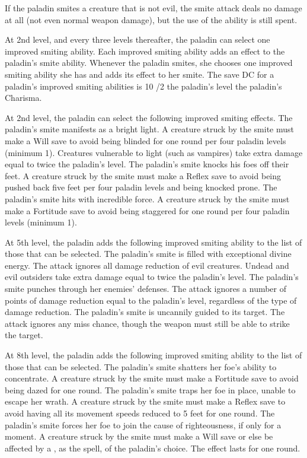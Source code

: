 If the paladin smites a creature that is not evil, the smite attack deals no damage at all (not even normal weapon damage), but the use of the ability is still spent.

 At 2nd level, and every three levels thereafter, the paladin can select one improved smiting ability. Each improved smiting ability adds an effect to the paladin's smite ability. Whenever the paladin smites, she chooses one improved smiting ability she has and adds its effect to her smite. The save DC for a paladin's improved smiting abilities is 10 /2 the paladin's level \add the paladin's Charisma.
\par At 2nd level, the paladin can select the following improved smiting effects.
 The paladin's smite manifests as a bright light. A creature struck by the smite must make a Will save to avoid being blinded for one round per four paladin levels (minimum 1). Creatures vulnerable to light (such as vampires) take extra damage equal to twice the paladin's level.
 The paladin's smite knocks his foes off their feet. A creature struck by the smite must make a Reflex save to avoid being pushed back five feet per four paladin levels and being knocked prone.
 The paladin's smite hits with incredible force. A creature struck by the smite must make a Fortitude save to avoid being staggered for one round per four paladin levels (minimum 1).

At 5th level, the paladin adds the following improved smiting ability to the list of those that can be selected.
 The paladin's smite is filled with exceptional divine energy. The attack ignores all damage reduction of evil creatures. Undead and evil outsiders take extra damage equal to twice the paladin's level.
 The paladin's smite punches through her enemies' defenses. The attack ignores a number of points of damage reduction equal to the paladin's level, regardless of the type of damage reduction.
 The paladin's smite is uncannily guided to its target. The attack ignores any miss chance, though the weapon must still be able to strike the target.

At 8th level, the paladin adds the following improved smiting ability to the list of those that can be selected.
 The paladin's smite shatters her foe's ability to concentrate. A creature struck by the smite must make a Fortitude save to avoid being dazed for one round.
 The paladin's smite traps her foe in place, unable to escape her wrath. A creature struck by the smite must make a Reflex save to avoid having all its movement speeds reduced to 5 feet for one round.
 The paladin's smite forces her foe to join the cause of righteousness, if only for a moment. A creature struck by the smite must make a Will save or else be affected by a , as the spell, of the paladin's choice. The effect lasts for one round.

